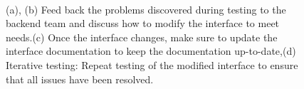 \documentclass[journal]{IEEEtran}
\begin{document}
\begin{figure} 
  \centering
{}
  \hfill
{}
  \hfill
{}
  \hfill
  \\
\caption{(a), (b) Feed back the problems discovered during testing to the backend team and discuss how to modify the interface to meet needs.(c) Once the interface changes, make sure to update the interface documentation to keep the documentation up-to-date,(d) Iterative testing: Repeat testing of the modified interface to ensure that all issues have been resolved.}
\label{fig:collaboration} 
\end{figure}
\end{document}
